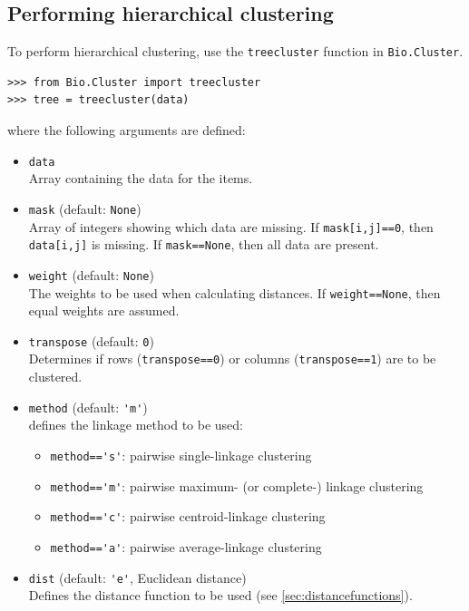 \documentclass{report}
\begin{document}
\subsection*{Performing hierarchical clustering}

To perform hierarchical clustering, use the \verb|treecluster| function in \verb|Bio.Cluster|.
\begin{verbatim}
>>> from Bio.Cluster import treecluster
>>> tree = treecluster(data)
\end{verbatim}
where the following arguments are defined:

\begin{itemize}
\item \verb|data| \\
Array containing the data for the items.
\item \verb|mask| (default: \verb|None|) \\
Array of integers showing which data are missing. If \verb|mask[i,j]==0|, then \verb|data[i,j]| is missing. If \verb|mask==None|, then all data are present.
\item \verb|weight| (default: \verb|None|) \\
The weights to be used when calculating distances. If \verb|weight==None|, then equal weights are assumed.
\item \verb|transpose| (default: \verb|0|) \\
Determines if rows (\verb|transpose==0|) or columns (\verb|transpose==1|) are to be clustered.
\item \verb|method| (default: \verb|'m'|) \\
defines the linkage method to be used:
\begin{itemize}
\item \verb|method=='s'|: pairwise single-linkage clustering
\item \verb|method=='m'|: pairwise maximum- (or complete-) linkage clustering
\item \verb|method=='c'|: pairwise centroid-linkage clustering
\item \verb|method=='a'|: pairwise average-linkage clustering
\end{itemize}
\item \verb|dist| (default: \verb|'e'|, Euclidean distance) \\
Defines the distance function to be used (see \ref{sec:distancefunctions}).
\end{itemize}
\end{document}
